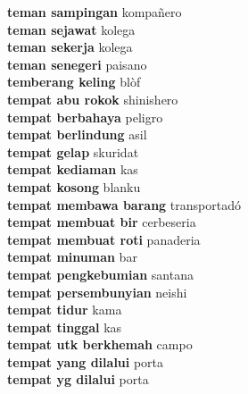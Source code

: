 \textbf{ teman sampingan  } kompañero \\
\textbf{ teman sejawat  } kolega \\
\textbf{ teman sekerja  } kolega \\
\textbf{ teman senegeri  } paisano \\
\textbf{ temberang keling  } blòf \\
\textbf{ tempat abu rokok  } shinishero \\
\textbf{ tempat berbahaya  } peligro \\
\textbf{ tempat berlindung  } asil \\
\textbf{ tempat gelap  } skuridat \\
\textbf{ tempat kediaman  } kas \\
\textbf{ tempat kosong  } blanku \\
\textbf{ tempat membawa barang  } transportadó \\
\textbf{ tempat membuat bir  } cerbeseria \\
\textbf{ tempat membuat roti  } panaderia \\
\textbf{ tempat minuman  } bar \\
\textbf{ tempat pengkebumian  } santana \\
\textbf{ tempat persembunyian  } neishi \\
\textbf{ tempat tidur  } kama \\
\textbf{ tempat tinggal  } kas \\
\textbf{ tempat utk berkhemah  } campo \\
\textbf{ tempat yang dilalui  } porta \\
\textbf{ tempat yg dilalui  } porta \\
